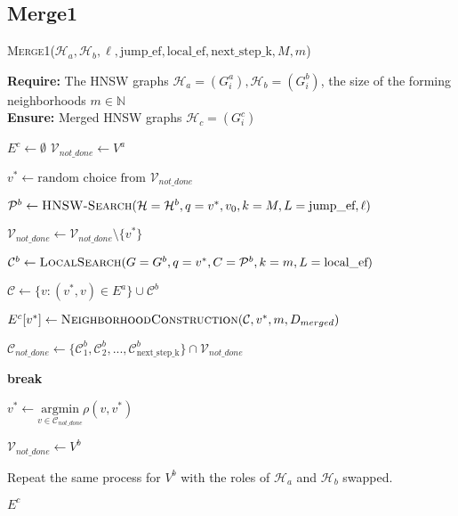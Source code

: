 \documentclass{article}
\begin{document}
\subsection{Merge1}

\begin{algorithm}
\caption{\textsc{Merge1}($\mathcal{H}_a, \mathcal{H}_b, \ell, \text{jump\_ef}, \text{local\_ef}, \text{next\_step\_k}, M, m$)}\label{alg:merge1}
\textbf{Require:} The HNSW graphs $\mathcal{H}_a = (G^a_i), \mathcal{H}_b = (G^b_i)$, the size of the forming neighborhoods $m \in \mathbb{N} $ \\
\textbf{Ensure:}  Merged HNSW graphs $\mathcal{H}_c = (G^c_i)$ 
\begin{algorithmic}[1]

\State $E^c \gets \emptyset$
\State $\mathcal{V}_{not\_done} \gets V^a$

    \State $v^* \gets \text{random choice from } \mathcal{V}_{not\_done}$
    
    \State $\mathcal{P}^b  \gets \textsc{HNSW-Search}(\mathcal{H}=\mathcal{H}^b, q=v^*, v_0, k=M, L=\text{jump\_ef}, \ell)$
    
        \State $\mathcal{V}_{not\_done} \gets \mathcal{V}_{not\_done} \setminus \{v^*\}$
        
        \State $\mathcal{C}^b  \gets \textsc{LocalSearch}(G=G^b, q=v^*, C=\mathcal{P}^b , k=m, L=\text{local\_ef})$
        
        \State $\mathcal{C} \gets  \{v : (v^*, v) \in E^a \} \cup \mathcal{C}^b$
        
        \State $E^c[v^*] \gets \textsc{NeighborhoodConstruction}(\mathcal{C}, v^*, m, D_{merged})$
        
        \State $\mathcal{C}_{not\_done} \gets \{\mathcal{C}^b_1, \mathcal{C}^b_2, ..., \mathcal{C}^b_{ \text{next\_step\_k} } \} \cap \mathcal{V}_{not\_done}$
        
            \State \textbf{break}
        \EndIf
        
        \State $v^* \gets \underset{v \in \mathcal{C}_{not\_done}}{\mathrm{argmin}} \rho(v, v^*)$
    \EndWhile
\EndWhile

\State $\mathcal{V}_{not\_done} \gets V^b$

    \State Repeat the same process for $V^b$ with the roles of $\mathcal{H}_a$ and $\mathcal{H}_b$ swapped.
\EndWhile

\State \Return $E^c$

\end{algorithmic}
\end{algorithm}
\end{document}
